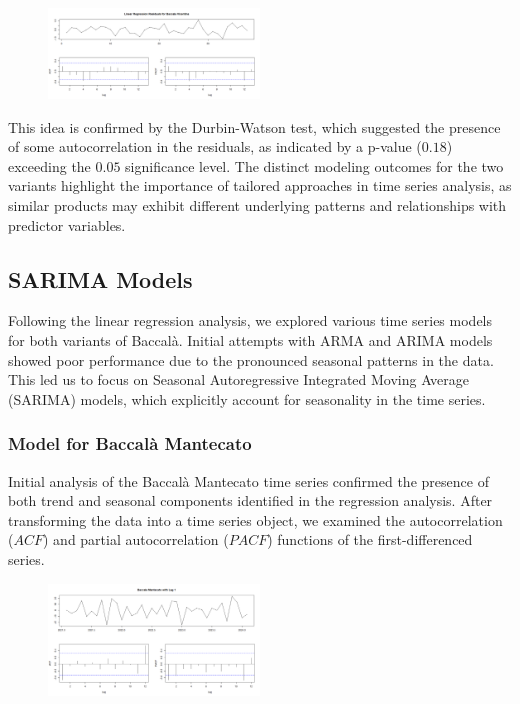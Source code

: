 \documentclass[10pt,twocolumn,letterpaper]{article}
\begin{document}
\begin{figure}[H]
    \centering
    \includegraphics[width=0.5\textwidth]{PlotsBEFD/RES_LR_VIC.png} 
    \caption{}
    \label{fig:RES_LR_VIC}
\end{figure}
This idea is confirmed by the Durbin-Watson test, which suggested the presence of some autocorrelation in the residuals, as indicated by a p-value ($0.18$) exceeding the $0.05$ significance level.
The distinct modeling outcomes for the two variants highlight the importance of tailored approaches in time series analysis, as similar products may exhibit different underlying patterns and relationships with predictor variables.

\subsection{SARIMA Models}
Following the linear regression analysis, we explored various time series models for both variants of Baccalà. Initial attempts with ARMA and ARIMA models showed poor performance due to the pronounced seasonal patterns in the data. This led us to focus on Seasonal Autoregressive Integrated Moving Average (SARIMA) models, which explicitly account for seasonality in the time series.

\subsubsection{Model for Baccalà Mantecato}
Initial analysis of the Baccalà Mantecato time series confirmed the presence of both trend and seasonal components identified in the regression analysis. After transforming the data into a time series object, we examined the autocorrelation ($ACF$) and partial autocorrelation ($PACF$) functions of the first-differenced series. 

\begin{figure}[H]
    \centering
    \includegraphics[width=0.5\textwidth]{PlotsBEFD/ACF_MAN_LAG1.png} 
    \caption{}
    \label{fig:ACF_MAN_LAG1}
\end{figure}
\end{document}
